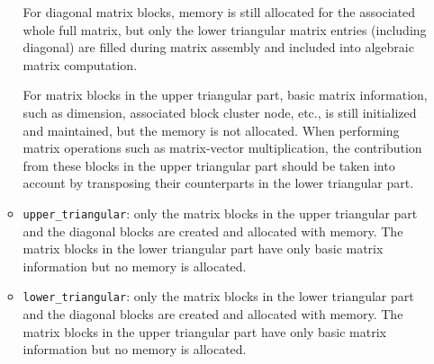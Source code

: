 \documentclass[11pt, a4paper]{article}
\begin{document}
\begin{enumerate}
\begin{itemize}
    For diagonal matrix blocks, memory is still allocated for the associated whole full
    matrix, but only the lower triangular matrix entries (including diagonal) are filled
    during matrix assembly and included into algebraic matrix computation.

    For matrix blocks in the upper triangular part, basic matrix information, such as
    dimension, associated block cluster node, etc., is still initialized and maintained,
    but the memory is not allocated. When performing matrix operations such as
    matrix-vector multiplication, the contribution from these blocks in the upper
    triangular part should be taken into account by transposing their counterparts in the
    lower triangular part.
  \item \texttt{upper\_triangular}: only the matrix blocks in the upper triangular part and
    the diagonal blocks are created and allocated with memory. The matrix blocks in the
    lower triangular part have only basic matrix information but no memory is allocated.
  \item \texttt{lower\_triangular}: only the matrix blocks in the lower triangular part and
    the diagonal blocks are created and allocated with memory. The matrix blocks in the
    upper triangular part have only basic matrix information but no memory is allocated.
  \end{itemize}
\end{enumerate}
\end{document}
